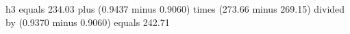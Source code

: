 h3 equals 234.03 plus (0.9437 minus 0.9060) times (273.66 minus 269.15) divided by (0.9370 minus 0.9060) equals 242.71
